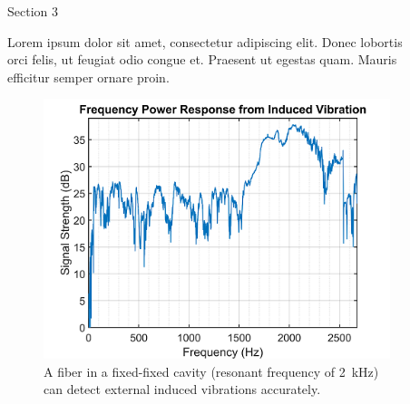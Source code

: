 \documentclass[final]{beamer}
\newlength{\sepwid}
\newlength{\onecolwid}
\begin{document}
\begin{frame}[t]
\begin{columns}[t]
\begin{column}{\onecolwid}

\begin{block}{Section 3} 

Lorem ipsum dolor sit amet, consectetur adipiscing elit. Donec lobortis orci felis, ut feugiat odio congue et. Praesent ut egestas quam. Mauris efficitur semper ornare proin.

\end{block}
\vspace{-0.3in}

\begin{figure}
\includegraphics[width=1\linewidth]{Images/frequency_response_LQ.png}
\caption{A fiber in a fixed-fixed cavity (resonant frequency of \SI{2}{\kilo\hertz}) can detect external induced vibrations accurately.}
\end{figure}


\end{column} %

\begin{column}{\sepwid}\end{column} %

\begin{column}{\onecolwid} %



\end{column}
\end{columns}
\end{frame}
\end{document}
